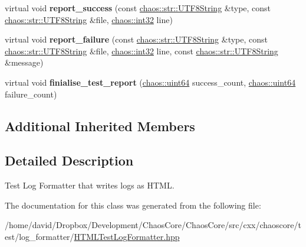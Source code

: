\begin{DoxyCompactItemize}
\item 
\hypertarget{classchaos_1_1test_1_1log__formatter_1_1_h_t_m_l_test_log_formatter_a0a5e7371888b0fa9e741cebc5a333d8e}{virtual void {\bfseries report\-\_\-success} (const \hyperlink{classchaos_1_1str_1_1_u_t_f8_string}{chaos\-::str\-::\-U\-T\-F8\-String} \&type, const \hyperlink{classchaos_1_1str_1_1_u_t_f8_string}{chaos\-::str\-::\-U\-T\-F8\-String} \&file, \hyperlink{namespacechaos_ad1de7efb430365afd2c9446a0f522a90}{chaos\-::int32} line)}\label{classchaos_1_1test_1_1log__formatter_1_1_h_t_m_l_test_log_formatter_a0a5e7371888b0fa9e741cebc5a333d8e}

\item 
\hypertarget{classchaos_1_1test_1_1log__formatter_1_1_h_t_m_l_test_log_formatter_a9b37a5d07fcb6765b8be6f02765e6561}{virtual void {\bfseries report\-\_\-failure} (const \hyperlink{classchaos_1_1str_1_1_u_t_f8_string}{chaos\-::str\-::\-U\-T\-F8\-String} \&type, const \hyperlink{classchaos_1_1str_1_1_u_t_f8_string}{chaos\-::str\-::\-U\-T\-F8\-String} \&file, \hyperlink{namespacechaos_ad1de7efb430365afd2c9446a0f522a90}{chaos\-::int32} line, const \hyperlink{classchaos_1_1str_1_1_u_t_f8_string}{chaos\-::str\-::\-U\-T\-F8\-String} \&message)}\label{classchaos_1_1test_1_1log__formatter_1_1_h_t_m_l_test_log_formatter_a9b37a5d07fcb6765b8be6f02765e6561}

\item 
\hypertarget{classchaos_1_1test_1_1log__formatter_1_1_h_t_m_l_test_log_formatter_a1e8fd2552a2d2e3aa309449acdf43fa1}{virtual void {\bfseries finialise\-\_\-test\-\_\-report} (\hyperlink{namespacechaos_a34fe5f5bfc3ef6d80b5d094ed91b4d6e}{chaos\-::uint64} success\-\_\-count, \hyperlink{namespacechaos_a34fe5f5bfc3ef6d80b5d094ed91b4d6e}{chaos\-::uint64} failure\-\_\-count)}\label{classchaos_1_1test_1_1log__formatter_1_1_h_t_m_l_test_log_formatter_a1e8fd2552a2d2e3aa309449acdf43fa1}

\end{DoxyCompactItemize}
\subsection*{Additional Inherited Members}


\subsection{Detailed Description}
Test Log Formatter that writes logs as H\-T\-M\-L. 

The documentation for this class was generated from the following file\-:\begin{DoxyCompactItemize}
\item 
/home/david/\-Dropbox/\-Development/\-Chaos\-Core/\-Chaos\-Core/src/cxx/chaoscore/test/log\-\_\-formatter/\hyperlink{_h_t_m_l_test_log_formatter_8hpp}{H\-T\-M\-L\-Test\-Log\-Formatter.\-hpp}\end{DoxyCompactItemize}
